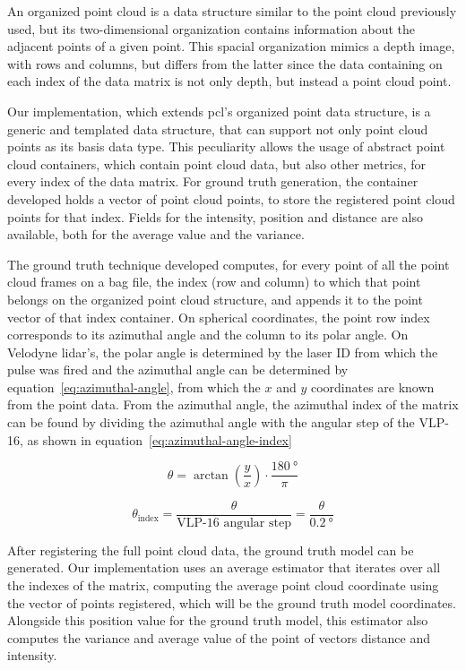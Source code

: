 An organized point cloud is a data structure similar to the point cloud previously used, but its two-dimensional organization contains information about the adjacent points of a given point. This spacial organization mimics a depth image, with rows and columns, but differs from the latter since the data containing on each index of the data matrix is not only depth, but instead a point cloud point.

Our implementation, which extends \ac{pcl}'s organized point data structure, is a generic and templated data structure, that can support not only point cloud points as its basis data type. This peculiarity allows the usage of abstract point cloud containers, which contain point cloud data, but also other metrics, for every index of the data matrix. For ground truth generation, the container developed holds a vector of point cloud points, to store the registered point cloud points for that index. Fields for the intensity, position and distance are also available, both for the average value and the variance.

The ground truth technique developed computes, for every point of all the point cloud frames on a bag file, the index (row and column) to which that point belongs on the organized point cloud structure, and appends it to the point vector of that index container. On spherical coordinates, the point row index corresponds to its azimuthal angle and the column to its polar angle. On Velodyne \ac{lidar}'s, the polar angle is determined by the laser ID from which the pulse was fired and the azimuthal angle can be determined by equation~\ref{eq:azimuthal-angle}, from which the $x$ and $y$ coordinates are known from the point data. From the azimuthal angle, the azimuthal index of the matrix can be found by dividing the azimuthal angle with the angular step of the VLP-16, as shown in equation~\ref{eq:azimuthal-angle-index}

\begin{equation}
\label{eq:azimuthal-angle}
\theta = \arctan\left(\frac{y}{x}\right) \cdot \frac{\SI{180}{\degree}}{\pi}
\end{equation}

\begin{equation}
\label{eq:azimuthal-angle-index}
\theta_{\text{index}} = \frac{\theta}{\text{VLP-16 angular step}} = \frac{\theta}{\SI{0.2}{\degree}} 
\end{equation}


After registering the full point cloud data, the ground truth model can be generated. Our implementation uses an average estimator that iterates over all the indexes of the matrix, computing the average point cloud coordinate using the vector of points registered, which will be the ground truth model coordinates. Alongside this position value for the ground truth model, this estimator also computes the variance and average value of the point of vectors distance and intensity.



